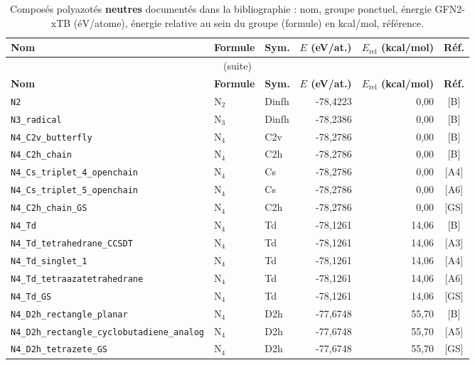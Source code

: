 \begin{longtable}{@{}p{4.4cm}lp{1.5cm}rrc@{}}
\caption{Compos\'es polyazot\'es \textbf{neutres} document\'es dans la bibliographie : nom, groupe ponctuel, \'energie GFN2-xTB (\'eV/atome), \'energie relative au sein du groupe (formule) en kcal/mol, r\'ef\'erence.}
\label{tab:final-neutre}\\
\toprule
\textbf{Nom} & \textbf{Formule} & \textbf{Sym.} & \textbf{$E$ (eV/at.)} & \textbf{$E_{\mathrm{rel}}$ (kcal/mol)} & \textbf{R\'ef.} \\
\midrule
\endfirsthead
\multicolumn{6}{c}{\small (suite)}\\
\toprule
\textbf{Nom} & \textbf{Formule} & \textbf{Sym.} & \textbf{$E$ (eV/at.)} & \textbf{$E_{\mathrm{rel}}$ (kcal/mol)} & \textbf{R\'ef.} \\
\midrule
\endhead
\bottomrule
\endfoot
\bottomrule
\endlastfoot
\addlinespace
\texttt{N2} & N$_{2}$ & Dinfh & -78{,}4223 & 0{,}00 & [B] \\
\addlinespace
\texttt{N3\_radical} & N$_{3}$ & Dinfh & -78{,}2386 & 0{,}00 & [B] \\
\addlinespace
\texttt{N4\_C2v\_butterfly} & N$_{4}$ & C2v & -78{,}2786 & 0{,}00 & [B] \\
\texttt{N4\_C2h\_chain} & N$_{4}$ & C2h & -78{,}2786 & 0{,}00 & [B] \\
\texttt{N4\_Cs\_triplet\_4\_openchain} & N$_{4}$ & Cs & -78{,}2786 & 0{,}00 & [A4] \\
\texttt{N4\_Cs\_triplet\_5\_openchain} & N$_{4}$ & Cs & -78{,}2786 & 0{,}00 & [A6] \\
\texttt{N4\_C2h\_chain\_GS} & N$_{4}$ & C2h & -78{,}2786 & 0{,}00 & [GS] \\
\texttt{N4\_Td} & N$_{4}$ & Td & -78{,}1261 & 14{,}06 & [B] \\
\texttt{N4\_Td\_tetrahedrane\_CCSDT} & N$_{4}$ & Td & -78{,}1261 & 14{,}06 & [A3] \\
\texttt{N4\_Td\_singlet\_1} & N$_{4}$ & Td & -78{,}1261 & 14{,}06 & [A4] \\
\texttt{N4\_Td\_tetraazatetrahedrane} & N$_{4}$ & Td & -78{,}1261 & 14{,}06 & [A6] \\
\texttt{N4\_Td\_GS} & N$_{4}$ & Td & -78{,}1261 & 14{,}06 & [GS] \\
\texttt{N4\_D2h\_rectangle\_planar} & N$_{4}$ & D2h & -77{,}6748 & 55{,}70 & [B] \\
\texttt{N4\_D2h\_rectangle\_cyclobutadiene\_analog} & N$_{4}$ & D2h & -77{,}6748 & 55{,}70 & [A5] \\
\texttt{N4\_D2h\_tetrazete\_GS} & N$_{4}$ & D2h & -77{,}6748 & 55{,}70 & [GS] \\

\end{longtable}
